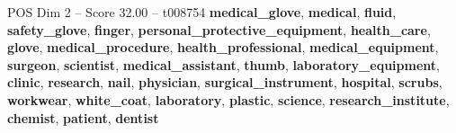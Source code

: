 \begin{textsample}{POS Dim 2 – Score 32.00 – t008754}  \label{ex:f2_pos_004}
\textbf{medical\_glove}, \textbf{medical}, \textbf{fluid}, \textbf{safety\_glove}, \textbf{finger}, \textbf{personal\_protective\_equipment}, \textbf{health\_care}, \textbf{glove}, \textbf{medical\_procedure}, \textbf{health\_professional}, \textbf{medical\_equipment}, \textbf{surgeon}, \textbf{scientist}, \textbf{medical\_assistant}, \textbf{thumb}, \textbf{laboratory\_equipment}, \textbf{clinic}, \textbf{research}, \textbf{nail}, \textbf{physician}, \textbf{surgical\_instrument}, \textbf{hospital}, \textbf{scrubs}, \textbf{workwear}, \textbf{white\_coat}, \textbf{laboratory}, \textbf{plastic}, \textbf{science}, \textbf{research\_institute}, \textbf{chemist}, \textbf{patient}, \textbf{dentist}

\end{textsample}

